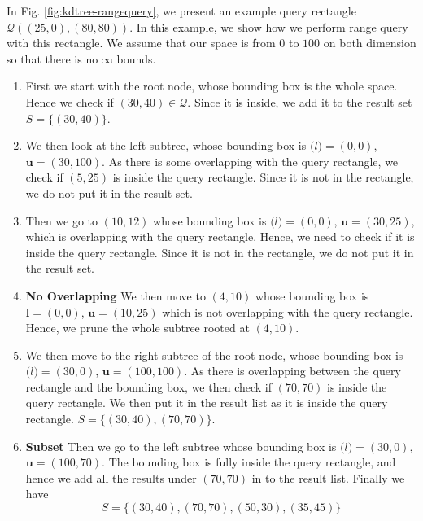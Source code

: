 \begin{mscexample}
	In Fig. \ref{fig:kdtree-rangequery}, we present an example query rectangle $\mathcal{Q}((25,0),(80, 80))$. In this example, we show how we perform range query with this rectangle. We assume that our space is from $0$ to $100$ on both dimension so that there is no $\infty$ bounds.
	\begin{enumerate}
		\item First we start with the root node, whose bounding box is the whole space. Hence we check if $(30,40)\in\mathcal{Q}$. Since it is inside, we add it to the result set $S=\{(30, 40)\}$.
		\item We then look at the left subtree, whose bounding box is $\boldsymbol(l)=(0,0)$, $\boldsymbol{u}=(30,100)$. As there is some overlapping with the query rectangle, we check if $(5,25)$ is inside the query rectangle. Since it is not in the rectangle, we do not put it in the result set.
		\item Then we go to $(10,12)$ whose bounding box is $\boldsymbol(l)=(0,0)$, $\boldsymbol{u}=(30,25)$, which is overlapping with the query rectangle. Hence, we need to check if it is inside the query rectangle. Since it is not in the rectangle, we do not put it in the result set.
		\item \textbf{No Overlapping} We then move to $(4, 10)$ whose bounding box is $\boldsymbol{l}=(0,0)$, $\boldsymbol{u}=(10,25)$ which is not overlapping with the query rectangle. Hence, we prune the whole subtree rooted at $(4,10)$.
		\item We then move to the right subtree of the root node, whose bounding box is $\boldsymbol(l)=(30,0)$, $\boldsymbol{u}=(100,100)$. As there is overlapping between the query rectangle and the bounding box, we then check if $(70,70)$ is inside the query rectangle. We then put it in the result list as it is inside the query rectangle. $S=\{(30,40), (70,70)\}$.
		\item \textbf{Subset} Then we go to the left subtree whose bounding box is $\boldsymbol(l)=(30,0)$, $\boldsymbol{u}=(100,70)$. The bounding box is fully inside the query rectangle, and hence we add all the results under $(70, 70)$ in to the result list. Finally we have 
			$$S=\{(30,40), (70,70), (50,30), (35,45)\}$$
	\end{enumerate}
\end{mscexample}